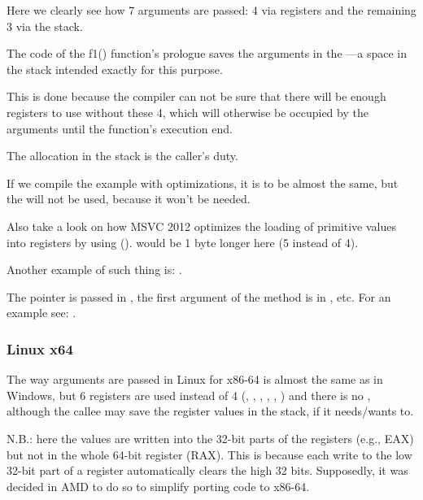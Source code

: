 
Here we clearly see how 7 arguments are passed: 4 via registers and the remaining 3 via the stack.

The code of the f1() function's prologue saves the arguments in the ---a space in the stack
intended exactly for this purpose.

This is done because the compiler can not be sure that there will be enough registers to use without these 4,
which will otherwise be occupied by the arguments until the function's execution end.

The  allocation in the stack is the caller's duty.



If we compile the example with optimizations, it is to be almost the same, 
but the  will not be used, because it won't be needed.

\label{using_MOV_and_pack_of_LEA_to_load_values}

Also take a look on how MSVC 2012 optimizes the loading of primitive values into registers by using \LEA ().
 would be 1 byte longer here (5 instead of 4).

Another example of such thing is: .


The \ITthis pointer is passed in \RCX, the first argument of the method is in \RDX, etc.
For an example see: .
 
\subsubsection{Linux x64}

The way arguments are passed in Linux for x86-64 is almost the same as in Windows, but 6 registers are
used instead of 4 (\RDI, \RSI, \RDX, \RCX, , ) and there is no , 
although the \gls{callee} may save the register values in the stack, if it needs/wants to.




N.B.: here the values are written into the 32-bit parts of the registers (e.g., EAX) but not in the whole 64-bit 
register (RAX).
This is because each write to the low 32-bit part of a register automatically clears the high 32 bits.
Supposedly, it was decided in AMD to do so to simplify porting code to x86-64.

